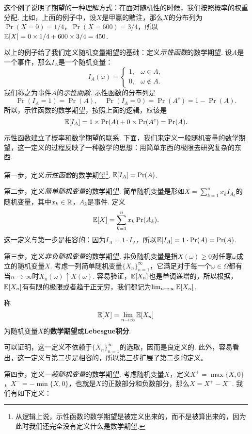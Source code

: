 这个例子说明了期望的一种理解方式：在面对随机性的时候，我们按照概率的权重分配. 比如，上面的例子中，设$X$是甲赢的赌注，那么$X$的分布列为$\Pr(X=0)=1/4$，$\Pr(X=600)=3/4$，所以$\mathbb{E}[X]=0\times 1/4+600\times 3/4=450$.

以上的例子给了我们定义随机变量期望的基础：定义\emph{示性函数}的数学期望. 设$A$是一个事件，那么$I_A$是一个随机变量：
\[I_A(\omega)=\begin{cases}
    1,&\omega\in A,\\
    0,&\omega\notin A.
\end{cases}\]
我们称之为事件$A$的\emph{示性函数}. 示性函数的分布列是
\[\Pr(I_A=1)=\Pr(A),\quad \Pr(I_A=0)=\Pr(A^c)=1-\Pr(A).\]
所以，示性函数的数学期望，按照上面的逻辑，应该是
\[\mathbb{E}[I_A]=1\times\Pr(A)+0\times\Pr(A^c)=\Pr(A).\]

示性函数建立了概率和数学期望的联系. 下面，我们来定义一般随机变量的数学期望，这一定义的过程反映了一种数学的思想：用简单东西的极限去研究复杂的东西. 

第一步，定义\emph{示性函数}的数学期望\footnote{从逻辑上说，示性函数的数学期望是被定义出来的，而不是被算出来的，因为此时我们还完全没有定义什么是数学期望. }. $\mathbb{E}[I_A]=\Pr(A)$.

第二步，定义\emph{简单随机变量}的数学期望. 简单随机变量是形如$X=\sum_{k=1}^n x_kI_{A_k}$的随机变量，其中$x_k\in\mathbb{R}$，$A_k$是事件. 定义
\[\mathbb{E}[X]=\sum_{k=1}^n x_k\Pr(A_k).\]
这一定义与第一步是相容的：因为$I_A=1\cdot I_{A}$，所以$\mathbb{E}[I_A]=1\cdot\Pr(A)=\Pr(A)$. 

第三步，定义\emph{非负随机变量}的数学期望. 非负随机变量是指$X(\omega)\geq 0$对任意$\omega$成立的随机变量$X$. 考虑一列简单随机变量$\{X_n\}_{n=1}^\infty$，它满足对于每一个$\omega\in\Omega$都有当$n\to\infty$时$X_n(\omega)\uparrow X(\omega)$. 容易验证，$\mathbb{E}[X_n]$也是单调递增的，所以根据，$\mathbb{E}[X_n]$有有限的极限或者趋于正无穷，我们都记为$\lim_{n\to\infty} \mathbb{E}[X_n]$.

\begin{definition}
称
\[\mathbb{E}[X]=\lim_{n\to\infty}\mathbb{E}[X_n]\]
为随机变量$X$的\textbf{数学期望}或\textbf{Lebesgue积分}. 
\end{definition}

可以证明，这一定义不依赖于$\{X_n\}_{n=1}^\infty$的选取，因而是良定义的. 此外，容易看出，这一定义与第二步是相容的，所以第三步扩展了第二步的定义。

第四步，定义\emph{一般随机变量}的数学期望. 考虑随机变量$X$，定义$X^+=\max\{X,0\}$，$X^-=-\min\{X,0\}$，也就是$X$的正数部分和负数部分，那么$X=X^+-X^-$. 我们有如下定义：

